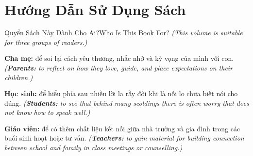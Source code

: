 \chapter*{Hướng Dẫn Sử Dụng Sách}

\begin{truyen}{Quyển Sách Này Dành Cho Ai?}{Who Is This Book For?}
\textit{(This volume is suitable for three groups of readers.)}

\textbf{Cha mẹ:} để soi lại cách yêu thương, nhắc nhở và kỳ vọng của mình với con.
\textit{(\textbf{Parents:} to reflect on how they love, guide, and place expectations on their children.)}

\textbf{Học sinh:} để hiểu phía sau nhiều lời la rầy đôi khi là nỗi lo chưa biết nói cho đúng.
\textit{(\textbf{Students:} to see that behind many scoldings there is often worry that does not know how to speak well.)}

\textbf{Giáo viên:} để có thêm chất liệu kết nối giữa nhà trường và gia đình trong các buổi sinh hoạt hoặc tư vấn.
\textit{(\textbf{Teachers:} to gain material for building connection between school and family in class meetings or counselling.)}
\end{truyen}

\vspace{6pt}

